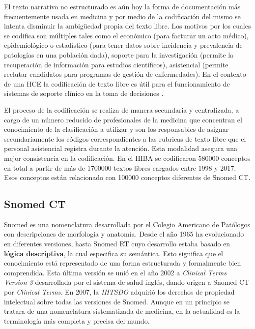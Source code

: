 El texto narrativo no estructurado es aún hoy la forma de documentación más frecuentemente usada en medicina y por medio de la codificación del mismo se intenta disminuir la ambigüedad propia del texto libre. Los motivos por los cuales se codifica son múltiples tales como el económico (para facturar un acto médico), epidemiológico o estadístico (para tener datos sobre incidencia y prevalencia de patologías en una población dada), soporte para la investigación (permite la recuperación de información para estudios científicos), asistencial (permite reclutar candidatos para programas de gestión de enfermedades). En el contexto de una HCE la codificación de texto libre es útil para el funcionamiento de sistemas de soporte clínico en la toma de decisiones \cite{lopez2004codificacion,lopez2002creacion}. 

El proceso de la codificación se realiza de manera secundaria y centralizada, a cargo de un número reducido de profesionales de la medicina que concentran el conocimiento de la clasificación a utilizar y son los responsables de asignar secundariamente los códigos correspondientes a las rubricas de texto libre que el personal asistencial registra durante la atención. Esta modalidad asegura una mejor consistencia en la codificación\cite{lopez2004codificacion,lopez2005desarrollo}. En el \acrshort{HIBA} se codificaron \num{580000} conceptos en total a partir de más de \num{1700000} textos libres cargados entre \num{1998} y \num{2017}. Esos conceptos están relacionado con \num{100000} conceptos diferentes de Snomed CT. 

\subsection{Snomed CT}
Snomed es una nomenclatura desarrollada por el Colegio Americano de Patólogos con descripciones de morfología y anatomía. Desde el año 1965 ha evolucionado en diferentes versiones, hasta Snomed RT cuyo desarrollo estaba basado en \textbf{lógica descriptiva}, la cual especifica su semántica. Esto significa que el conocimiento está representado de una forma estructurada y formalmente bien comprendida. Esta última versión se unió en el año 2002 a \textit{Clinical Terms Version 3} desarrollada por el sistema de salud inglés, dando origen a Snomed CT por \textit{Clinical Terms}. En 2007, la \textit{\acrfull{IHTSDO}} adquirió los derechos de propiedad intelectual sobre todas las versiones de Snomed. Aunque en un principio se tratara de una nomenclatura sistematizada de medicina, en la actualidad es la terminología más completa y precisa del mundo. \cite{Bhattacharyya2016}

